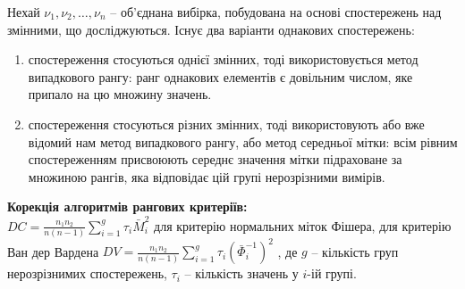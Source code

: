 Нехай $\nu_1, \nu_2, \ldots, \nu_n$ -- об'єднана вибірка, побудована на основі спостережень над змінними, що досліджуються. Існує два варіанти однакових спостережень:
\begin{enumerate}
    \item спостереження стосуються однієї змінних, тоді використовується метод випадкового рангу: ранг однакових елементів є довільним числом, яке припало на цю множину значень.
    
    \item спостереження стосуються різних змінних, тоді використовують або вже відомий нам метод випадкового рангу, або метод середньої мітки: всім рівним спостереженням присвоюють середнє значення мітки підраховане за множиною рангів, яка відповідає цій групі нерозрізними вимірів.
\end{enumerate}

\textbf{Корекція алгоритмів рангових критеріїв:} \\

$DC = \frac{n_1 n_2}{n(n-1)} \sum_{i=1}^g \tau_i \bar{M}_i^2$ для критерію нормальних міток Фішера, для критерію Ван дер Вардена $DV = \frac{n_1 n_2}{n(n-1)} \sum_{i=1}^g \tau_i \left( \bar{\Phi}_i^{-1} \right)^2$ , де $g$ -- кількість груп нерозрізнимих спостережень, $\tau_i$ -- кількість значень у $i$-ій групі.